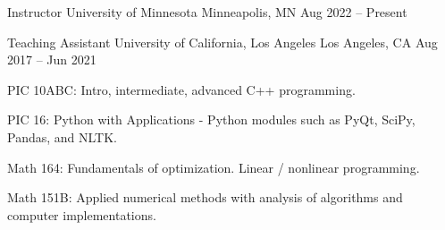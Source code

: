 
\begingroup
\allowdisplaybreaks

\begin{cventries}

  \cventry
    {Instructor} %
    {University of Minnesota} %
    {Minneapolis, MN} %
    {Aug 2022 – Present} %
    {
      \begin{cvteachings}
      \end{cvteachings}
    }


  \cventry
    {Teaching Assistant} %
    {University of California, Los Angeles} %
    {Los Angeles, CA} %
    {Aug 2017 – Jun 2021} %
    {
      \begin{cvitems} %
        \item {PIC 10ABC: Intro, intermediate, advanced C++ programming.}
        \item {PIC 16: Python with Applications} - Python modules such as PyQt, SciPy, Pandas, and NLTK.
        \item {Math 164: Fundamentals of optimization. Linear / nonlinear programming}.
        \item {Math 151B: Applied numerical methods with analysis of algorithms and computer implementations}.
      \end{cvitems}
    }


\end{cventries}

